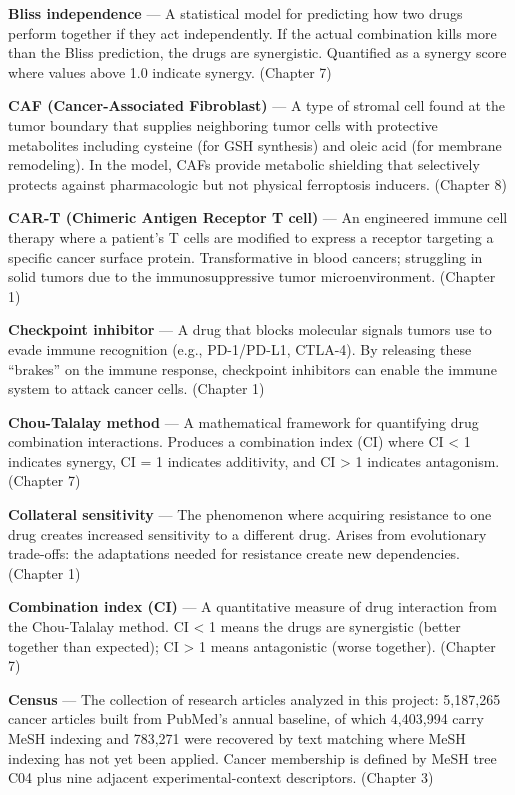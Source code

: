 \documentclass[11pt,twoside,openright]{report}
\begin{document}
\textbf{Bliss independence} --- A statistical model for predicting how two drugs perform together if they act independently. If the actual combination kills more than the Bliss prediction, the drugs are synergistic. Quantified as a synergy score where values above 1.0 indicate synergy. (Chapter 7)

\textbf{CAF (Cancer-Associated Fibroblast)} --- A type of stromal cell found at the tumor boundary that supplies neighboring tumor cells with protective metabolites including cysteine (for GSH synthesis) and oleic acid (for membrane remodeling). In the model, CAFs provide metabolic shielding that selectively protects against pharmacologic but not physical ferroptosis inducers. (Chapter 8)

\textbf{CAR-T (Chimeric Antigen Receptor T cell)} --- An engineered immune cell therapy where a patient's T cells are modified to express a receptor targeting a specific cancer surface protein. Transformative in blood cancers; struggling in solid tumors due to the immunosuppressive tumor microenvironment. (Chapter 1)

\textbf{Checkpoint inhibitor} --- A drug that blocks molecular signals tumors use to evade immune recognition (e.g., PD-1/PD-L1, CTLA-4). By releasing these ``brakes'' on the immune response, checkpoint inhibitors can enable the immune system to attack cancer cells. (Chapter 1)

\textbf{Chou-Talalay method} --- A mathematical framework for quantifying drug combination interactions. Produces a combination index (CI) where CI < 1 indicates synergy, CI = 1 indicates additivity, and CI > 1 indicates antagonism. (Chapter 7)

\textbf{Collateral sensitivity} --- The phenomenon where acquiring resistance to one drug creates increased sensitivity to a different drug. Arises from evolutionary trade-offs: the adaptations needed for resistance create new dependencies. (Chapter 1)

\textbf{Combination index (CI)} --- A quantitative measure of drug interaction from the Chou-Talalay method. CI < 1 means the drugs are synergistic (better together than expected); CI > 1 means antagonistic (worse together). (Chapter 7)

\textbf{Census} --- The collection of research articles analyzed in this project: 5,187,265 cancer articles built from PubMed's annual baseline, of which 4,403,994 carry MeSH indexing and 783,271 were recovered by text matching where MeSH indexing has not yet been applied. Cancer membership is defined by MeSH tree C04 plus nine adjacent experimental-context descriptors. (Chapter 3)
\end{document}
